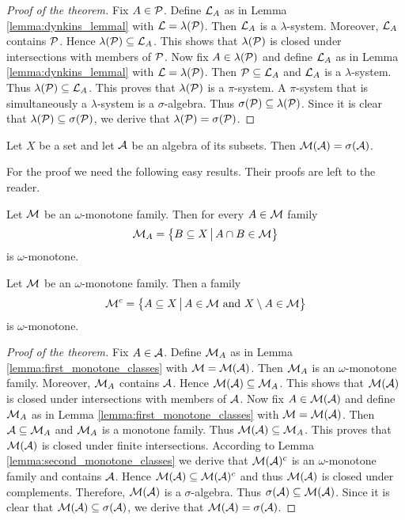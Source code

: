 \begin{proof}[Proof of the theorem]
    Fix $A\in {\mathcal P}$. Define ${\mathcal L}_A$ as in Lemma \ref{lemma:dynkins_lemmal} with ${\mathcal L} = \lambda({\mathcal P})$. Then ${\mathcal L}_A$ is a $\lambda$-system. Moreover, ${\mathcal L}_A$ contains ${\mathcal P}$. Hence $\lambda({\mathcal P})\subseteq {\mathcal L}_A$. This shows that $\lambda({\mathcal P})$ is closed under intersections with members of ${\mathcal P}$. Now fix $A\in \lambda({\mathcal P})$ and define ${\mathcal L}_A$ as in Lemma \ref{lemma:dynkins_lemmal} with ${\mathcal L} = \lambda({\mathcal P})$. Then ${\mathcal P} \subseteq {\mathcal L}_A$ and ${\mathcal L}_A$ is a $\lambda$-system. Thus $\lambda({\mathcal P})\subseteq {\mathcal L}_A$. This proves that $\lambda({\mathcal P})$ is a $\pi$-system. A $\pi$-system that is simultaneously a $\lambda$-system is a $\sigma$-algebra. Thus $\sigma({\mathcal P})\subseteq \lambda({\mathcal P})$. Since it is clear that $\lambda({\mathcal P}) \subseteq \sigma({\mathcal P})$, we derive that $\lambda({\mathcal P})=\sigma({\mathcal P})$.
\end{proof}

\begin{theorem}\label{theorem:monotone_classes}
    Let $X$ be a set and let ${\mathcal A}$ be an algebra of its subsets. Then ${\mathcal M}({\mathcal A})=\sigma({\mathcal A})$.
\end{theorem}
\noindent
For the proof we need the following easy results. Their proofs are left to the reader.

\begin{lemma}\label{lemma:first_monotone_classes}
    Let ${\mathcal M}$ be an $\omega$-monotone family. Then for every $A \in {\mathcal M}$ family
    $${\mathcal M}_A = \big\{B\subseteq X\,\big|\,A\cap B\in {\mathcal M}\big\}$$
    is $\omega$-monotone.
\end{lemma}

\begin{lemma}\label{lemma:second_monotone_classes}
    Let ${\mathcal M}$ be an $\omega$-monotone family. Then a family
    $${\mathcal M}^c= \big\{A \subseteq X \,\big|\,A\in {\mathcal M}\mbox{ and }X\setminus A\in {\mathcal M}\big\}$$
    is $\omega$-monotone.
\end{lemma}

\begin{proof}[Proof of the theorem]
    Fix $A\in {\mathcal A}$. Define ${\mathcal M}_A$ as in Lemma \ref{lemma:first_monotone_classes} with ${\mathcal M} = {\mathcal M}({\mathcal A})$. Then ${\mathcal M}_A$ is an $\omega$-monotone family. Moreover, ${\mathcal M}_A$ contains ${\mathcal A}$. Hence ${\mathcal M}({\mathcal A})\subseteq {\mathcal M}_A$. This shows that ${\mathcal M}({\mathcal A})$ is closed under intersections with members of ${\mathcal A}$. Now fix $A\in {\mathcal M}({\mathcal A})$ and define ${\mathcal M}_A$ as in Lemma \ref{lemma:first_monotone_classes} with ${\mathcal M} = {\mathcal M}({\mathcal A})$. Then ${\mathcal A} \subseteq {\mathcal M}_A$ and ${\mathcal M}_A$ is a monotone family. Thus ${\mathcal M}({\mathcal A})\subseteq {\mathcal M}_A$. This proves that ${\mathcal M}({\mathcal A})$ is closed under finite intersections. According to Lemma \ref{lemma:second_monotone_classes} we derive that ${\mathcal M}({\mathcal A})^c$ is an $\omega$-monotone family and contains ${\mathcal A}$. Hence ${\mathcal M}({\mathcal A})\subseteq {\mathcal M}({\mathcal A})^c$ and thus ${\mathcal M}({\mathcal A})$ is closed under complements. Therefore, ${\mathcal M}({\mathcal A})$ is a $\sigma$-algebra. Thus $\sigma({\mathcal A})\subseteq {\mathcal M}({\mathcal A})$. Since it is clear that ${\mathcal M}({\mathcal A}) \subseteq \sigma({\mathcal A})$, we derive that ${\mathcal M}({\mathcal A}) = \sigma({\mathcal A})$.
\end{proof}

